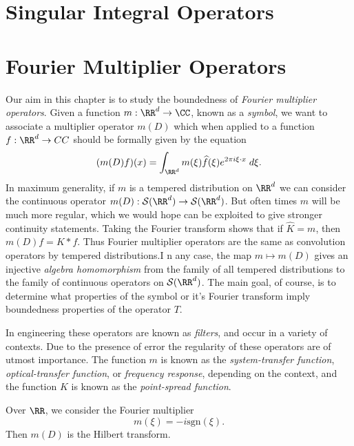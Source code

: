 \chapter{Singular Integral Operators}




\chapter{Fourier Multiplier Operators}

Our aim in this chapter is to study the boundedness of \emph{Fourier multiplier operators}. Given a function $m: \RR^d \to \CC$, known as a \emph{symbol}, we want to associate a multiplier operator $m(D)$ which when applied to a function $f: \RR^d \to CC$ should be formally given by the equation
%
\[ (m(D)f)(x) = \int_{\RR^d} m(\xi) \widehat{f}(\xi) e^{2 \pi i \xi \cdot x}\; d\xi. \]
%
In maximum generality, if $m$ is a tempered distribution on $\RR^d$ we can consider the continuous operator $m(D): \mathcal{S}(\RR^d) \to \mathcal{S}(\RR^d)$. But often times $m$ will be much more regular, which we would hope can be exploited to give stronger continuity statements. Taking the Fourier transform shows that if $\widehat{K} = m$, then $m(D) f = K * f$. Thus Fourier multiplier operators are the same as convolution operators by tempered distributions.I n any case, the map $m \mapsto m(D)$ gives an injective \emph{algebra homomorphism} from the family of all tempered distributions to the family of continuous operators on $\mathcal{S}(\RR^d)$. The main goal, of course, is to determine what properties of the symbol or it's Fourier transform imply boundedness properties of the operator $T$.

\begin{remark}
  In engineering these operators are known as \emph{filters}, and occur in a variety of contexts. Due to the presence of error the regularity of these operators are of utmost importance. The function $m$ is known as the \emph{system-transfer function}, \emph{optical-transfer function}, or \emph{frequency response}, depending on the context, and the function $K$ is known as the \emph{point-spread function}.
\end{remark}

\begin{example}
  Over $\RR$, we consider the Fourier multiplier
  \[ m(\xi) = - i \text{sgn}(\xi). \]
  Then $m(D)$ is the Hilbert transform.
\end{example}

